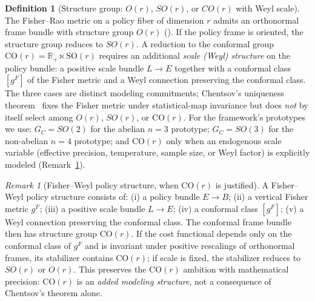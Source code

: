 \documentclass[11pt,a4paper]{article}
\theoremstyle{plain}
\theoremstyle{definition}
\newtheorem{definition}[theorem]{Definition}
\theoremstyle{remark}
\newtheorem{remark}[theorem]{Remark}
\newcommand{\RR}{\mathbb{R}}
\newcommand{\SO}{\mathrm{SO}}
\newcommand{\CO}{\mathrm{CO}}
\begin{document}
\begin{definition}[Structure group: $O(r)$, $SO(r)$, or $CO(r)$ with Weyl scale]
\label{def:struct}
The Fisher--Rao metric on a policy fiber of dimension $r$ admits an
orthonormal frame bundle with structure group $O(r)$
(\cite{kobayashinomizu1969,amari2000}). If the policy frame is
oriented, the structure group reduces to $SO(r)$. A reduction to the
conformal group $\CO(r) = \RR_+ \ltimes \SO(r)$ requires an additional
\emph{scale (Weyl) structure} on the policy bundle: a positive scale
bundle $L \to E$ together with a conformal class $[g^F]$ of the
Fisher metric and a Weyl connection preserving the conformal class.
The three cases are distinct modeling commitments; Chentsov's
uniqueness theorem~\cite{chentsov1982} fixes the Fisher metric under
statistical-map invariance but does \emph{not} by itself select among
$O(r)$, $SO(r)$, or $\CO(r)$. For the framework's prototypes we use:
$G_C = SO(2)$ for the abelian $n=3$ prototype; $G_C = SO(3)$ for the
non-abelian $n=4$ prototype; and $\CO(r)$ only when an endogenous
scale variable (effective precision, temperature, sample size, or
Weyl factor) is explicitly modeled (Remark~\ref{rem:fisher-weyl}).
\end{definition}

\begin{remark}[Fisher--Weyl policy structure, when $\CO(r)$ is justified]
\label{rem:fisher-weyl}
A Fisher--Weyl policy structure consists of: (i) a policy bundle
$E\to B$; (ii) a vertical Fisher metric $g^F$; (iii) a positive scale
bundle $L\to E$; (iv) a conformal class $[g^F]$; (v) a Weyl connection
preserving the conformal class. The conformal frame bundle then has
structure group $\CO(r)$. If the cost functional depends only on the
conformal class of $g^F$ and is invariant under positive rescalings of
orthonormal frames, its stabilizer contains $\CO(r)$; if scale is
fixed, the stabilizer reduces to $SO(r)$ or $O(r)$. This preserves the $\CO(r)$ ambition with mathematical precision: $\CO(r)$ is an
\emph{added modeling structure}, not a consequence of Chentsov's
theorem alone.
\end{remark}
\end{document}
